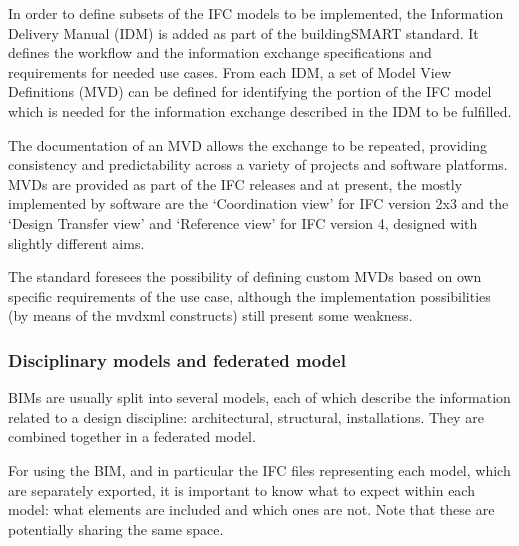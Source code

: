 In order to define subsets of the IFC models to be implemented, the Information Delivery Manual (IDM) is added as part of the buildingSMART standard.
It defines the workflow and the information exchange specifications and requirements for needed use cases.
From each IDM, a set of Model View Definitions (MVD) can be defined for identifying the portion of the IFC model which is needed for the information exchange described in the IDM to be fulfilled.

The documentation of an MVD allows the exchange to be repeated, providing consistency and predictability across a variety of projects and software platforms.
MVDs are provided as part of the IFC releases and at present, the mostly implemented by software are the `Coordination view' for IFC version 2x3 and the `Design Transfer view' and `Reference view' for IFC version 4, designed with slightly different aims.

The standard foresees the possibility of defining custom MVDs based on own specific requirements of the use case, although the implementation possibilities (by means of the mvdxml constructs) still present some weakness.


\subsubsection{Disciplinary models and federated model}\label{sec:fedmodels}

BIMs are usually split into several models, each of which describe the information related to a design discipline: architectural, structural, installations.
They are combined together in a federated model.

For using the BIM, and in particular the IFC files representing each model, which are separately exported, it is important to know what to expect within each model: what elements are included and which ones are not.
Note that these are potentially sharing the same space.
%

